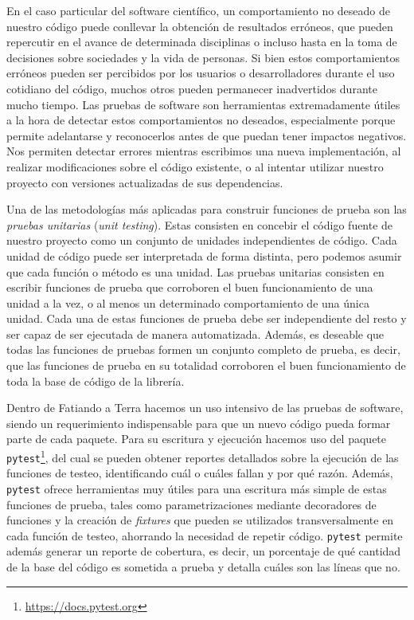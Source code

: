 En el caso particular del software científico, un comportamiento no deseado de
nuestro código puede conllevar la obtención de resultados erróneos, que pueden
repercutir en el avance de determinada disciplinas o incluso hasta en la toma
de decisiones sobre sociedades y la vida de personas.
Si bien estos comportamientos erróneos pueden ser percibidos por los usuarios
o desarrolladores durante el uso cotidiano del código, muchos otros pueden
permanecer inadvertidos durante mucho tiempo.
Las pruebas de software son herramientas extremadamente útiles a la hora de
detectar estos comportamientos no deseados, especialmente porque permite
adelantarse y reconocerlos antes de que puedan tener impactos negativos.
Nos permiten detectar errores mientras escribimos una nueva implementación, al
realizar modificaciones sobre el código existente, o al intentar utilizar
nuestro proyecto con versiones actualizadas de sus dependencias.

Una de las metodologías más aplicadas para construir funciones de prueba son
las \emph{pruebas unitarias} (\emph{unit testing}).
Estas consisten en concebir el código fuente de nuestro proyecto como un
conjunto de unidades independientes de código.
Cada unidad de código puede ser interpretada de forma distinta, pero podemos
asumir que cada función o método es una unidad.
Las pruebas unitarias consisten en escribir funciones de prueba que corroboren
el buen funcionamiento de una unidad a la vez, o al menos un determinado
comportamiento de una única unidad.
Cada una de estas funciones de prueba debe ser independiente del resto y ser
capaz de ser ejecutada de manera automatizada.
Además, es deseable que todas las funciones de pruebas formen un conjunto
completo de prueba, es decir, que las funciones de prueba en su totalidad
corroboren el buen funcionamiento de toda la base de código de la librería.

Dentro de Fatiando a Terra hacemos un uso intensivo de las pruebas de software,
siendo un requerimiento indispensable para que un nuevo código pueda formar
parte de cada paquete.
Para su escritura y ejecución hacemos uso del paquete
\texttt{pytest}\footnote{\url{https://docs.pytest.org}}, del cual se pueden
obtener reportes detallados sobre la ejecución de las funciones de testeo,
identificando cuál o cuáles fallan y por qué razón.
Además, \texttt{pytest} ofrece herramientas muy útiles para una escritura más
simple de estas funciones de prueba, tales como parametrizaciones mediante
decoradores de funciones y la creación de \emph{fixtures} que pueden se
utilizados transversalmente en cada función de testeo, ahorrando la necesidad
de repetir código.
\texttt{pytest} permite además generar un reporte de cobertura, es decir, un
porcentaje de qué cantidad de la base del código es sometida a prueba y
detalla cuáles son las líneas que no.

